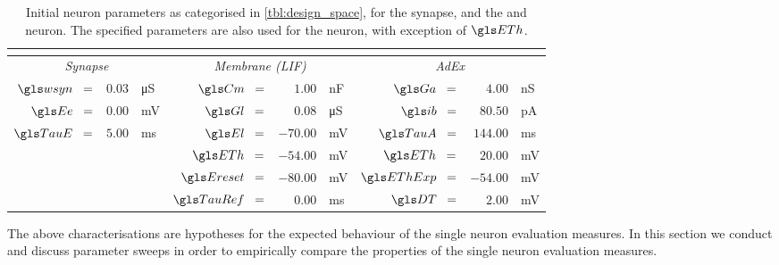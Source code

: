 \begin{table}
	\centering
	\small
	\renewcommand{\arraystretch}{1.2}
	\begin{tabular}{r r l r r l r r l}
		\toprule
		\multicolumn{9}{c}{\spacedlowsmallcaps{Initial neuron parameters}} \\
		\midrule

		  \multicolumn{3}{c}{\textit{Synapse}}
		& \multicolumn{3}{c}{\textit{Membrane (LIF)}}
		& \multicolumn{3}{c}{\textit{AdEx}} \\
		\cmidrule(r){1-3}\cmidrule(l){4-6}\cmidrule(l){7-9}

			  $\wsyn \;\;=$ & $0.03$ & \si{\micro\siemens}
			& $\Cm \;\;=$ & $1.00$ & \si{\nano\farad}
			& $\Ga \;\;=$ & $4.00$ & \si{\nano\siemens} \\

			  $\Ee \;\;=$ & $0.00$ & \si{\milli\volt}
			& $\Gl \;\;=$ & $0.08$ & \si{\micro\siemens}
			& $\ib \;\;=$ & $80.50$ & \si{\pico\ampere} \\

			  $\TauE \;\;=$ & $5.00$ & \si{\milli\second}
			& $\El \;\;=$ & $-70.00$ & \si{\milli\volt}
			& $\TauA \;\;=$ & $144.00$ & \si{\milli\second} \\

			&&
			& $\ETh \;\;=$ & $-54.00$ & \si{\milli\volt}
			& $\ETh \;\;=$ & $20.00$ & \si{\milli\volt} \\

			&&
			& $\Ereset \;\;=$ & $-80.00$ & \si{\milli\volt}
			& $\EThExp \;\;=$ & $-54.00$ & \si{\milli\volt} \\

			&&
			& $\TauRef \;\;=$ & $0.00$ & \si{\milli\second}
			& $\DT \;\;=$ & $2.00$ & \si{\milli\volt} \\
		\bottomrule
	\end{tabular}
	\caption[Initial neuron parameters]{Initial neuron parameters as categorised in \cref{tbl:design_space}, for the synapse, and the \LIF and \AdEx neuron. The specified \LIF parameters are also used for the \AdEx neuron, with exception of $\ETh$.}
	\label{tbl:initial_parameters}
\end{table}

The above characterisations are hypotheses for the expected behaviour of the single neuron evaluation measures. In this section we conduct and discuss parameter sweeps in order to empirically compare the properties of the single neuron evaluation measures.

